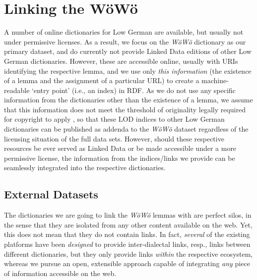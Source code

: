 \section{Linking the WöWö}

A number of online dictionaries for Low German are available, but usually not under permissive licenses. As a result, we focus on the \emph{WöWö} dictionary as our primary dataset, and do currently not provide Linked Data editions of other Low German dictionaries. However, these are accessible online, usually with URIs identifying the respective lemma, and we use only \emph{this information} (the existence of a lemma and the assignment of a particular URL) to create a machine-readable `entry point' (i.e., an index) in RDF. As we do not use any specific information from the dictionaries other than the existence of a lemma, we assume that this information does not meet the threshold of originality legally required for copyright to apply \citet{Margoni2016},
so that these LOD indices to other Low German dictionaries can be published as addenda to the \emph{WöWö} dataset regardless of the licensing situation of the full data sets. However, should these respective resources be ever served as Linked Data or be made accessible under a more permissive license, the information from the indices/links we provide can be seamlessly integrated into the respective dictionaries.

\subsection{External Datasets}

The dictionaries we are going to link the \emph{WöWö} lemmas with are perfect silos, in the sense that they are isolated from any other content available on the web. Yet, this does not mean that they do not contain links. In fact, \emph{several} of the existing platforms have been \emph{designed} to provide inter-dialectal links, resp., links between different dictionaries, but they only provide links \emph{within} the respective ecosystem, whereas we pursue an open, extensible approach capable of integrating \emph{any} piece of information accessible on the web. 

